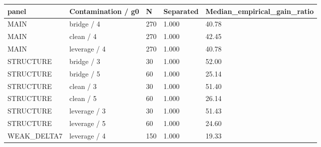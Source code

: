 \begin{tabular}{lllll}
\toprule
panel & Contamination / g0 & N & Separated & Median\_empirical\_gain\_ratio \\
\midrule
MAIN & bridge / 4 & 270 & 1.000 & 40.78 \\
MAIN & clean / 4 & 270 & 1.000 & 42.45 \\
MAIN & leverage / 4 & 270 & 1.000 & 40.78 \\
STRUCTURE & bridge / 3 & 30 & 1.000 & 52.00 \\
STRUCTURE & bridge / 5 & 60 & 1.000 & 25.14 \\
STRUCTURE & clean / 3 & 30 & 1.000 & 51.40 \\
STRUCTURE & clean / 5 & 60 & 1.000 & 26.14 \\
STRUCTURE & leverage / 3 & 30 & 1.000 & 51.43 \\
STRUCTURE & leverage / 5 & 60 & 1.000 & 24.60 \\
WEAK\_DELTA7 & leverage / 4 & 150 & 1.000 & 19.33 \\
\bottomrule
\end{tabular}
